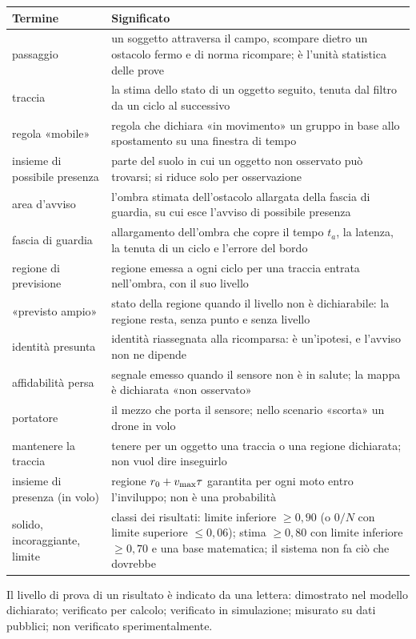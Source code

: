{\medskip
\begin{tabularx}{\textwidth}{@{}p{3.6cm}L@{}}
\toprule
Termine & Significato\\
\midrule
passaggio & un soggetto attraversa il campo, scompare dietro un ostacolo fermo e di norma ricompare; è l'unità statistica delle prove\\
traccia & la stima dello stato di un oggetto seguito, tenuta dal filtro da un ciclo al successivo\\
regola «mobile» & regola che dichiara «in movimento» un gruppo in base allo spostamento su una finestra di tempo\\
insieme di possibile presenza & parte del suolo in cui un oggetto non osservato può trovarsi; si riduce solo per osservazione\\
area d'avviso & l'ombra stimata dell'ostacolo allargata della fascia di guardia, su cui esce l'avviso di possibile presenza\\
fascia di guardia & allargamento dell'ombra che copre il tempo $t_a$, la latenza, la tenuta di un ciclo e l'errore del bordo\\
regione di previsione & regione emessa a ogni ciclo per una traccia entrata nell'ombra, con il suo livello\\
«previsto ampio» & stato della regione quando il livello non è dichiarabile: la regione resta, senza punto e senza livello\\
identità presunta & identità riassegnata alla ricomparsa: è un'ipotesi, e l'avviso non ne dipende\\
affidabilità persa & segnale emesso quando il sensore non è in salute; la mappa è dichiarata «non osservato»\\
portatore & il mezzo che porta il sensore; nello scenario «scorta» un drone in volo\\
mantenere la traccia & tenere per un oggetto una traccia o una regione dichiarata; non vuol dire inseguirlo\\
insieme di presenza (in volo) & regione $r_0+v_{\max}\tau$ garantita per ogni moto entro l'inviluppo; non è una probabilità\\
solido, incoraggiante, limite & classi dei risultati: limite inferiore $\ge0{,}90$ (o $0/N$ con limite superiore $\le0{,}06$); stima $\ge0{,}80$ con limite inferiore $\ge0{,}70$ e una base matematica; il sistema non fa ciò che dovrebbe\\
\bottomrule
\end{tabularx}}

Il livello di prova di un risultato è indicato da una lettera:  dimostrato nel modello dichiarato;  verificato per calcolo;  verificato in simulazione;  misurato su dati pubblici;  non verificato sperimentalmente.
